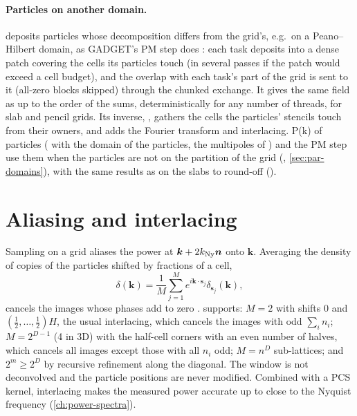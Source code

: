 \paragraph*{Particles on another domain.}  deposits particles whose decomposition differs from the
grid's, e.g.\ on a Peano--Hilbert domain, as GADGET's PM step does \cite{Springel2005}: each task deposits into a dense patch covering
the cells its particles touch (in several passes if the patch would exceed a cell budget), and the overlap with each task's part of the
grid is sent to it (all-zero blocks skipped) through the chunked exchange. It gives the same field as  up to the
order of the sums, deterministically for any number of threads, for slab and pencil grids. Its inverse,
, gathers the cells the particles' stencils touch from their owners, and
 adds the Fourier transform and interlacing. P(k) of particles
( with the domain of the particles, the multipoles of ) and the PM step
 use them when the particles are not on the partition of the grid
(, \cref{sec:par-domains}), with the same results as on the
slabs to round-off ().

\section{Aliasing and interlacing}\label{sec:ma-interlacing}

Sampling on a grid aliases the power at $\bm k+2k_{\rm Ny}\bm n$ onto $\bm k$. Averaging the density of copies of the particles
shifted by fractions of a cell,
\begin{equation}
\delta(\bm k)=\frac1M\sum_{j=1}^Me^{i\bm k\cdot\bm s_j}\delta_{\bm s_j}(\bm k),
\end{equation}
cancels the images whose phases add to zero \cite{Jing2005,Sefusatti2016}.  supports:
$M=2$ with shifts $0$ and $(\frac12,\ldots,\frac12)H$, the usual interlacing, which cancels the images with odd $\sum_in_i$;
$M=2^{D-1}$ (4 in 3D) with the half-cell corners with an even number of halves, which cancels all images except those with all $n_i$
odd; $M=n^D$ sub-lattices; and $2^m\ge2^D$ by recursive refinement along the diagonal. The window is not deconvolved and the particle
positions are never modified. Combined with a PCS kernel, interlacing makes the measured power accurate up to close to the Nyquist
frequency (\cref{ch:power-spectra}).

